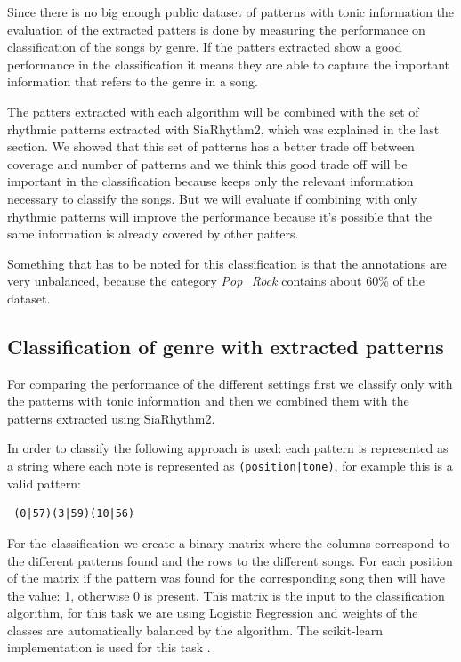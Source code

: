 \documentclass{article}
\begin{document}
Since there is no big enough public dataset of patterns with tonic information the evaluation of the extracted patters is done by measuring the performance on classification of the songs by genre. If the patters extracted show a good performance in the classification it means  they are able to capture the important information that refers to the genre in a song.  

The patters extracted with each algorithm will be combined with the set of rhythmic patterns extracted with SiaRhythm2, which was explained in the last section. We showed that this set of patterns has a better trade off between coverage and number of patterns and we think this good trade off will be important in the classification because keeps only the relevant information necessary to classify the songs. But we will evaluate if combining with only rhythmic patterns will improve the performance because it's possible that the same information is already covered by other patters.

Something that has to be noted for this classification is that the annotations are very unbalanced, because the category \textit{Pop\_Rock} contains about 60\% of the dataset.

\subsection{Classification of genre with extracted patterns}

For comparing the performance of the different settings first we classify only with the patterns with tonic information and then we combined them with the patterns extracted using SiaRhythm2. 

In order to classify the following approach is used: each pattern is represented as a string where each note is represented as \verb=(position|tone)=, for example this is a valid pattern: \begin{verbatim} (0|57)(3|59)(10|56) \end{verbatim}

For the classification we create a binary matrix where the columns correspond to the different patterns found and the rows to the different songs. For each position of the matrix if the pattern was found for the corresponding song then will have the value: 1, otherwise 0 is present. This matrix is the input to the classification algorithm, for this task we are using Logistic Regression and weights of the classes are automatically balanced by the algorithm. The scikit-learn implementation is used for this task \cite{scikit-learn}.
\end{document}
